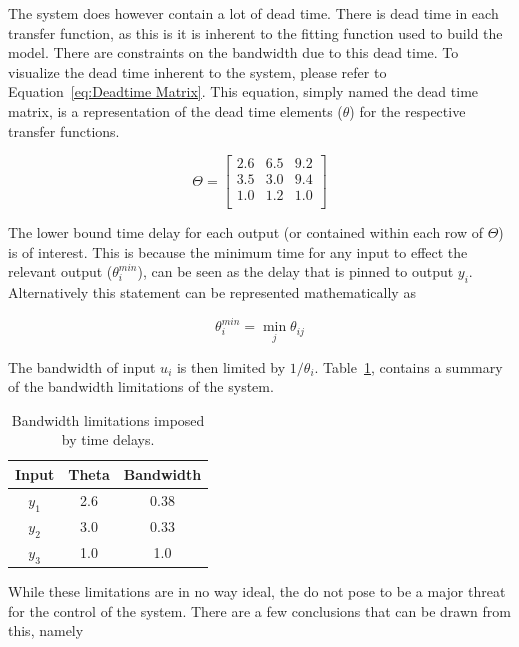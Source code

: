 The system does however contain a lot of dead time. There is dead time in each transfer function, as this is it is inherent to the fitting function used to build the model. There are constraints on the bandwidth due to this dead time. To visualize the dead time inherent to the system, please refer to Equation~\ref{eq:Deadtime Matrix}. This equation, simply named the dead time matrix, is a representation of the dead time elements ($\theta$) for the respective transfer functions.

\begin{equation}
	\label{eq:Deadtime Matrix}
	\Theta = \begin{bmatrix}
	 2.6 & 6.5 & 9.2 \\
	 3.5 & 3.0 & 9.4 \\
	 1.0 & 1.2 & 1.0\\
	\end{bmatrix}
\end{equation} 

The lower bound time delay for each output (or contained within each row of $\Theta$) is of interest. This is because the minimum time for any input to effect the relevant output ($\theta_i^{min}$), can be seen as the delay that is pinned to output $y_i$. Alternatively this statement can be represented mathematically as 

\begin{equation}
	\theta_i^{min} = \min_j \theta_{ij}
\end{equation}

The bandwidth of input $u_i$ is then limited by $1/\theta_i$. Table~\ref{tab:Bandwidths}, contains a summary of the bandwidth limitations of the system.

\begin{table}[H]
	\centering
	\begin{tabular}{ccc}
		\hline
		\textbf{Input} & \textbf{Theta} & \textbf{Bandwidth} \\
		\hline
		$y_1$             & 2.6            & 0.38               \\
		$y_2$             & 3.0              & 0.33               \\
		$y_3$             & 1.0              & 1.0                 \\\hline
	\end{tabular}
	\caption{Bandwidth limitations imposed by time delays.}
	\label{tab:Bandwidths}
\end{table}

While these limitations are in no way ideal, the do not pose to be a major threat for the control of the system. There are a few conclusions that can be drawn from this, namely

